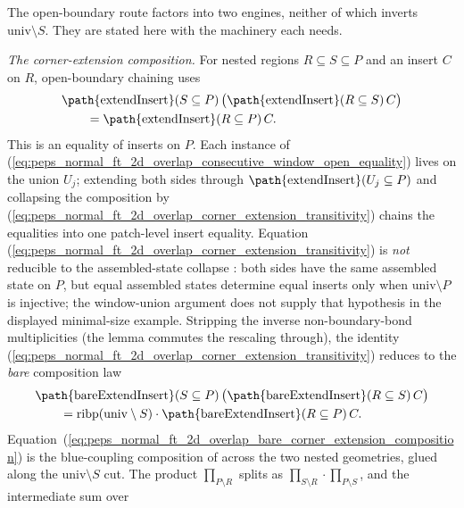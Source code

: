 \documentclass{article}
\begin{document}
The open-boundary route factors into two engines, neither of which inverts
$\mathrm{univ} \setminus S$. They are stated here with the machinery each needs.

\emph{The corner-extension composition.} For nested regions $R \subseteq S \subseteq P$ and an insert $C$ on
$R$, open-boundary chaining uses
\begin{align}
    &\text{\path{extendInsert}} (S \subseteq P)\,
    \bigl(\text{\path{extendInsert}} (R \subseteq S)\, C\bigr)
    \notag\\
    &\qquad = \text{\path{extendInsert}} (R \subseteq P)\, C.
    \label{eq:peps_normal_ft_2d_overlap_corner_extension_transitivity}
\end{align}
This is an equality of inserts on $P$.
Each instance of
(\ref{eq:peps_normal_ft_2d_overlap_consecutive_window_open_equality}) lives
on the union $U_j$;
extending both sides through $\text{\path{extendInsert}}(U_j \subseteq P)$ and
collapsing the composition by
(\ref{eq:peps_normal_ft_2d_overlap_corner_extension_transitivity}) chains the equalities into one
patch-level insert equality. Equation
(\ref{eq:peps_normal_ft_2d_overlap_corner_extension_transitivity}) is
\emph{not} reducible to the
assembled-state collapse : both sides have the
same assembled state on $P$, but equal assembled states determine equal inserts
only when $\mathrm{univ} \setminus P$ is injective; the window-union
argument does not supply that hypothesis in the displayed minimal-size
example. Stripping the inverse non-boundary-bond multiplicities (the lemma
 commutes the rescaling through), the identity
(\ref{eq:peps_normal_ft_2d_overlap_corner_extension_transitivity}) reduces to
the \emph{bare} composition law
\begin{align}
    &\text{\path{bareExtendInsert}} (S \subseteq P)\,
    \bigl(\text{\path{bareExtendInsert}} (R \subseteq S)\, C\bigr)
    \notag\\
    &\qquad = \mathrm{ribp}(\mathrm{univ} \setminus S)\cdot
    \text{\path{bareExtendInsert}} (R \subseteq P)\, C.
    \label{eq:peps_normal_ft_2d_overlap_bare_corner_extension_composition}
\end{align}
Equation~(\ref{eq:peps_normal_ft_2d_overlap_bare_corner_extension_composition})
is the blue-coupling composition of 
across the two nested geometries, glued along the $\mathrm{univ} \setminus S$
cut. The product $\prod_{P \setminus R}$ splits as $\prod_{S \setminus R}
    \cdot \prod_{P \setminus S}$, and the intermediate sum over
\end{document}
